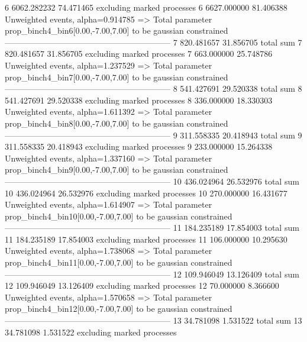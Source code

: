 6          6062.282232     74.471465       excluding marked processes    
6          6627.000000     81.406388       Unweighted events, alpha=0.914785
  => Total parameter prop_binch4_bin6[0.00,-7.00,7.00] to be gaussian constrained
------------------------------------------------------------
7          820.481657      31.856705       total sum                     
7          820.481657      31.856705       excluding marked processes    
7          663.000000      25.748786       Unweighted events, alpha=1.237529
  => Total parameter prop_binch4_bin7[0.00,-7.00,7.00] to be gaussian constrained
------------------------------------------------------------
8          541.427691      29.520338       total sum                     
8          541.427691      29.520338       excluding marked processes    
8          336.000000      18.330303       Unweighted events, alpha=1.611392
  => Total parameter prop_binch4_bin8[0.00,-7.00,7.00] to be gaussian constrained
------------------------------------------------------------
9          311.558335      20.418943       total sum                     
9          311.558335      20.418943       excluding marked processes    
9          233.000000      15.264338       Unweighted events, alpha=1.337160
  => Total parameter prop_binch4_bin9[0.00,-7.00,7.00] to be gaussian constrained
------------------------------------------------------------
10         436.024964      26.532976       total sum                     
10         436.024964      26.532976       excluding marked processes    
10         270.000000      16.431677       Unweighted events, alpha=1.614907
  => Total parameter prop_binch4_bin10[0.00,-7.00,7.00] to be gaussian constrained
------------------------------------------------------------
11         184.235189      17.854003       total sum                     
11         184.235189      17.854003       excluding marked processes    
11         106.000000      10.295630       Unweighted events, alpha=1.738068
  => Total parameter prop_binch4_bin11[0.00,-7.00,7.00] to be gaussian constrained
------------------------------------------------------------
12         109.946049      13.126409       total sum                     
12         109.946049      13.126409       excluding marked processes    
12         70.000000       8.366600        Unweighted events, alpha=1.570658
  => Total parameter prop_binch4_bin12[0.00,-7.00,7.00] to be gaussian constrained
------------------------------------------------------------
13         34.781098       1.531522        total sum                     
13         34.781098       1.531522        excluding marked processes    
